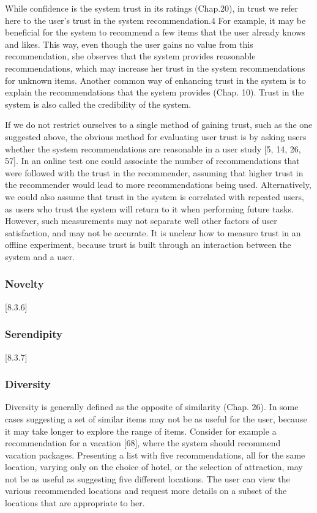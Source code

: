 While confidence is the system trust in its ratings (Chap.20), in trust we refer here to the user’s trust in the system recommendation.4 For example, it may be beneficial for the system to recommend a few items that the user already knows and likes. This way, even though the user gains no value from this recommendation, she observes that the system provides reasonable recommendations, which may increase her trust in the system recommendations for unknown items. Another common way of enhancing trust in the system is to explain the recommendations that the system provides (Chap. 10). Trust in the system is also called the credibility of the system. 

If we do not restrict ourselves to a single method of gaining trust, such as the one suggested above, the obvious method for evaluating user trust is by asking users whether the system recommendations are reasonable in a user study [5, 14, 26, 57]. In an online test one could associate the number of recommendations that were followed with the trust in the recommender, assuming that higher trust in the recommender would lead to more recommendations being used. Alternatively, we could also assume that trust in the system is correlated with repeated users, as users who trust the system will return to it when performing future tasks. However, such measurements may not separate well other factors of user satisfaction, and may not be accurate. It is unclear how to measure trust in an offline experiment, because trust is built through an interaction between the system and a user.

\subsubsection{Novelty}
[8.3.6]

\subsubsection{Serendipity}
[8.3.7]

\subsubsection{Diversity}

Diversity is generally defined as the opposite of similarity (Chap. 26). In some cases suggesting a set of similar items may not be as useful for the user, because it may take longer to explore the range of items. Consider for example a recommendation for a vacation [68], where the system should recommend vacation packages. Presenting a list with five recommendations, all for the same location, varying only on the choice of hotel, or the selection of attraction, may not be as useful as suggesting five different locations. The user can view the various recommended locations and request more details on a subset of the locations that are appropriate to her.


